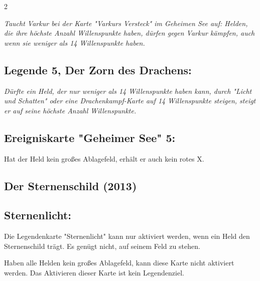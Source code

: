 \documentclass[10pt, a4paper, oneside]{book}
\newcommand{\fan}[1]{\textit{#1}}
\begin{document}
\begin{multicols*}{2}
\begin{bgcolor}
\fan{Taucht Varkur bei der Karte "Varkurs Versteck" im Geheimen See auf: Helden, die ihre höchste Anzahl Willenspunkte haben, dürfen gegen Varkur kämpfen, auch wenn sie weniger als 14 Willenspunkte haben.}




\subsection{Legende 5, Der Zorn des Drachens:}

\fan{Dürfte ein Held, der nur weniger als 14 Willenspunkte haben kann, durch "Licht und Schatten" oder eine Drachenkampf-Karte auf 14 Willenspunkte steigen, steigt er auf seine höchste Anzahl Willenspunkte.}



\subsection{Ereigniskarte "Geheimer See" 5:}

Hat der Held kein großes Ablagefeld, erhält er auch kein rotes X.





\end{bgcolor}



\columnbreak


\begin{bgcolor}
\section{Der Sternenschild (2013)}

\subsection{Sternenlicht:}

Die Legendenkarte "Sternenlicht" kann nur aktiviert werden, wenn ein Held den Sternenschild trägt. Es genügt nicht, auf seinem Feld zu stehen.\supercite{6196}

Haben alle Helden kein großes Ablagefeld, kann diese Karte nicht aktiviert werden. Das Aktivieren dieser Karte ist kein Legendenziel.

\end{bgcolor}



\begin{nobgcolor}


\end{nobgcolor}
\end{multicols*}
\end{document}
